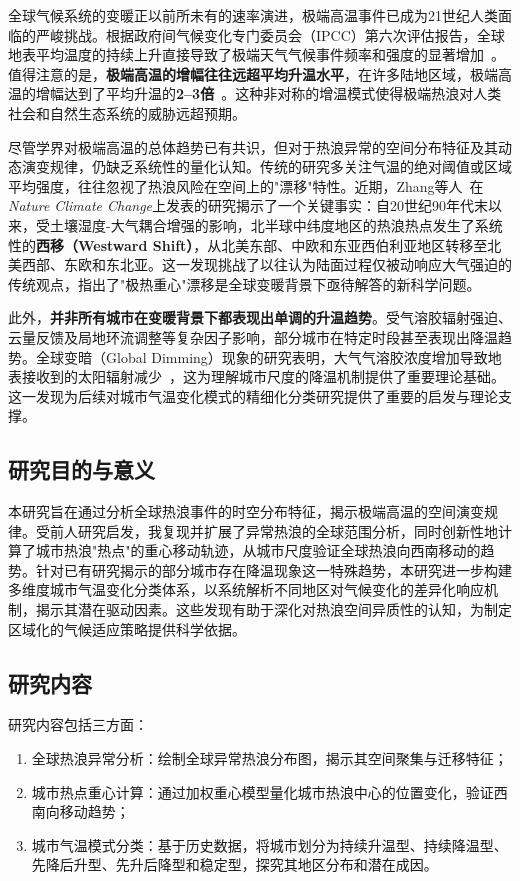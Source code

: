 \documentclass[a4paper,UTF8,scheme=chinese,zihao=-4,twoside]{ctexart}
\makeatletter
\newcommand{\初号}{\zihao{0}}
\newcommand{\小初}{\zihao{-0}}
\newcommand{\一号}{\zihao{1}}
\newcommand{\小一}{\zihao{-1}}
\newcommand{\二号}{\zihao{2}}
\newcommand{\小二}{\zihao{-2}}
\newcommand{\三号}{\zihao{3}}
\newcommand{\小三}{\zihao{-3}}
\newcommand{\四号}{\zihao{4}}
\newcommand{\小四}{\zihao{-4}}
\newcommand{\五号}{\zihao{5}}
\newcommand{\小五}{\zihao{-5}}
\newcommand{\六号}{\zihao{6}}
\newcommand{\小六}{\zihao{-6}}
\newcommand{\七号}{\zihao{7}}
\newcommand{\八号}{\zihao{8}}
\newcommand{\宋体}{\songti}
\newcommand{\黑体}{\heiti}
\newcommand{\仿宋}{\fangsong}
\newcommand{\楷书}{\kaishu}
\newcommand{\粗体}{\bfseries}
\newcommand{\斜体}{\itshape}
\newcommand\下划线[2][6em]{\hskip1pt\underline{\hb@xt@ #1{\hss#2\hss}}\hskip3pt}
\makeatother
\begin{document}
全球气候系统的变暖正以前所未有的速率演进，极端高温事件已成为21世纪人类面临的严峻挑战。根据政府间气候变化专门委员会（IPCC）第六次评估报告，全球地表平均温度的持续上升直接导致了极端天气气候事件频率和强度的显著增加~\cite{ipcc2021}。值得注意的是，\textbf{极端高温的增幅往往远超平均升温水平}，在许多陆地区域，极端高温的增幅达到了平均升温的\textbf{2–3倍}~\cite{fischer2010}。这种非对称的增温模式使得极端热浪对人类社会和自然生态系统的威胁远超预期。

尽管学界对极端高温的总体趋势已有共识，但对于热浪异常的空间分布特征及其动态演变规律，仍缺乏系统性的量化认知。传统的研究多关注气温的绝对阈值或区域平均强度，往往忽视了热浪风险在空间上的"漂移"特性。近期，Zhang等人~\cite{zhang2025}在\textit{Nature Climate Change}上发表的研究揭示了一个关键事实：自20世纪90年代末以来，受土壤湿度-大气耦合增强的影响，北半球中纬度地区的热浪热点发生了系统性的\textbf{西移（Westward Shift）}，从北美东部、中欧和东亚西伯利亚地区转移至北美西部、东欧和东北亚。这一发现挑战了以往认为陆面过程仅被动响应大气强迫的传统观点，指出了"极热重心"漂移是全球变暖背景下亟待解答的新科学问题。

此外，\textbf{并非所有城市在变暖背景下都表现出单调的升温趋势}。受气溶胶辐射强迫、云量反馈及局地环流调整等复杂因子影响，部分城市在特定时段甚至表现出降温趋势。全球变暗（Global Dimming）现象的研究表明，大气气溶胶浓度增加导致地表接收到的太阳辐射减少~\cite{stanhill2001,wild2009}，这为理解城市尺度的降温机制提供了重要理论基础。这一发现为后续对城市气温变化模式的精细化分类研究提供了重要的启发与理论支撑。

\subsection{研究目的与意义}

本研究旨在通过分析全球热浪事件的时空分布特征，揭示极端高温的空间演变规律。受前人研究启发，我复现并扩展了异常热浪的全球范围分析，同时创新性地计算了城市热浪"热点"的重心移动轨迹，从城市尺度验证全球热浪向西南移动的趋势。针对已有研究揭示的部分城市存在降温现象这一特殊趋势，本研究进一步构建多维度城市气温变化分类体系，以系统解析不同地区对气候变化的差异化响应机制，揭示其潜在驱动因素。这些发现有助于深化对热浪空间异质性的认知，为制定区域化的气候适应策略提供科学依据。

\subsection{研究内容}

研究内容包括三方面：

\begin{enumerate}[label=\arabic*、]
    \item 全球热浪异常分析：绘制全球异常热浪分布图，揭示其空间聚集与迁移特征；
    \item 城市热点重心计算：通过加权重心模型量化城市热浪中心的位置变化，验证西南向移动趋势；
    \item 城市气温模式分类：基于历史数据，将城市划分为持续升温型、持续降温型、先降后升型、先升后降型和稳定型，探究其地区分布和潜在成因。
\end{enumerate}
\end{document}
